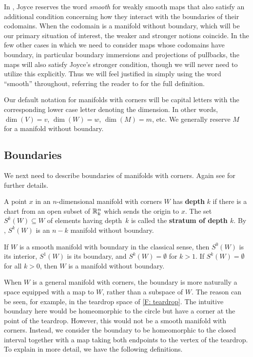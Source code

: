 In \cite{Joy12}, Joyce reserves the word \textit{smooth} for weakly smooth maps that also satisfy an additional condition concerning how they interact with the boundaries of their codomains.
When the codomain is a manifold without boundary, which will be our primary situation of interest, the weaker and stronger notions coincide.
In the few other cases in which we need to consider maps whose codomains have boundary, in particular boundary immersions and projections of pullbacks, the maps will also satisfy Joyce's stronger condition, though we will never need to utilize this explicitly.
Thus we will feel justified in simply using the word ``smooth'' throughout, referring the reader to \cite[Definition 3.1]{Joy12} for the full definition.

\begin{notation}
	Our default notation for manifolds with corners will be capital letters with the corresponding lower case letter denoting the dimension.
	In other words, $\dim(V) = v$, $\dim(W) = w$, $\dim(M) = m$, etc.
	We generally reserve $M$ for a manifold without boundary.
\end{notation}

\subsection{Boundaries}\label{S: boundaries}

We next need to describe boundaries of manifolds with corners.
Again see \cite[Section 2]{Joy12} for further details.

\begin{definition}
	A point $x$ in an $n$-dimensional manifold with corners $W$ has \textbf{depth} $k$ if there is a chart from an open subset of $\mathbb{R}^n_k$ which sends the origin to $x$.
	The set $S^k(W) \subseteq W$ of elements having depth~$k$ is called the \textbf{stratum of depth $k$}.
	By \cite[Proposition 2.4.]{Joy12}, $S^k(W)$ is an $n-k$ manifold without boundary.
\end{definition}

\begin{example}
	If $W$ is a smooth manifold with boundary in the classical sense, then $S^0(W)$ is its interior, $S^1(W)$ is its boundary, and $S^k(W) = \emptyset$ for $k>1$.
	If $S^k(W) = \emptyset$ for all $k>0$, then $W$ is a manifold without boundary.
\end{example}

When $W$ is a general manifold with corners, the boundary is more naturally a space equipped with a map to $W$, rather than a subspace of $W$.
The reason can be seen, for example, in the teardrop space of \cref{F: teardrop}. 
The intuitive boundary here would be homeomorphic to the circle but have a corner at the point of the teardrop.
However, this would not be a smooth manifold with corners.
Instead, we consider the boundary to be homeomorphic to the closed interval together with a map taking both endpoints to the vertex of the teardrop.
To explain in more detail, we have the following definitions.

